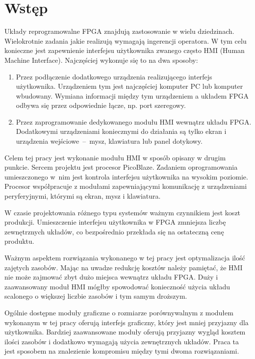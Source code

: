 
\rozdzial


\section{Wstęp}


Układy reprogramowalne FPGA znajdują zastosowanie w wielu dziedzinach. Wielokrotnie zadania jakie realizują wymagają ingerencji operatora. W tym celu konieczne jest zapewnienie interfejsu użytkownika zwanego często HMI (Human Machine Interface). Najczęściej wykonuje się to na dwa sposoby:
\begin{enumerate}
\item Przez podłączenie dodatkowego urządzenia realizującego interfejs użytkownika. Urządzeniem tym jest najczęściej komputer PC lub komputer wbudowany. Wymiana informacji między tym urządzeniem a układem FPGA odbywa się przez odpowiednie łącze, np. port szeregowy. 
\item Przez zaprogramowanie dedykowanego modułu HMI wewnątrz układu FPGA. Dodatkowymi urządzeniami koniecznymi do działania są tylko ekran i urządzenia wejściowe~--~mysz, klawiatura lub panel dotykowy.
\end{enumerate}

Celem tej pracy jest wykonanie modułu HMI w sposób opisany w drugim punkcie. Sercem projektu jest procesor PicoBlaze. Zadaniem oprogramowania umieszczonego w~nim jest kontrola interfejsu użytkownika na wysokim poziomie. Procesor współpracuje z modułami zapewniającymi komunikację z urządzeniami peryferyjnymi, którymi są ekran, mysz i klawiatura.

W czasie projektowania różnego typu systemów ważnym czynnikiem jest koszt produkcji. Umieszczenie interfejsu użytkownika w FPGA zmniejsza liczbę zewnętrznych układów, co bezpośrednio przekłada się na ostateczną cenę produktu. 

Ważnym aspektem rozwiązania wykonanego w tej pracy jest optymalizacja ilość zajętych zasobów. Mając na uwadze redukcję kosztów należy pamiętać, że HMI nie może zajmować zbyt dużo miejsca wewnątrz układu FPGA. Duży i zaawansowany moduł HMI mógłby spowodować konieczność użycia układu scalonego o większej liczbie zasobów i tym samym droższym.

Ogólnie dostępne moduły graficzne o rozmiarze porównywalnym z modułem wykonanym w tej pracy oferują interfejs graficzny, który jest mniej przyjazny dla użytkownika. Bardziej zaawansowane moduły oferują przyjazny wygląd kosztem ilości zasobów i dodatkowo wymagają użycia zewnętrznych układów. Praca ta jest sposobem na znalezienie kompromisu między tymi dwoma rozwiązaniami.


